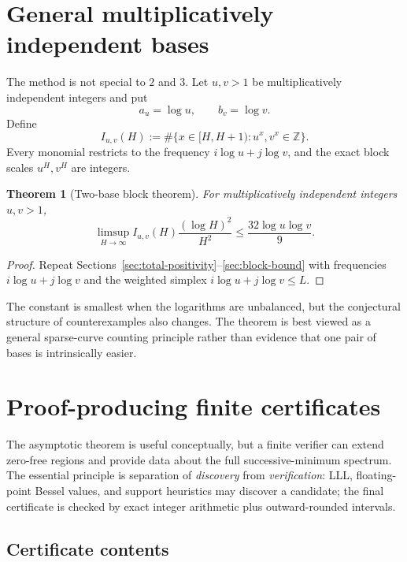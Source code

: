 \documentclass[11pt,oneside]{article}
\newtheorem{theorem}{Theorem}[section]
\theoremstyle{definition}
\theoremstyle{remark}
\newcommand{\Z}{\mathbb Z}
\begin{document}
\section{General multiplicatively independent bases}
\label{sec:general-bases}

The method is not special to $2$ and $3$.  Let $u,v>1$ be multiplicatively independent
integers and put
\[
 a_u=\log u,
 \qquad b_v=\log v.
\]
Define
\[
 I_{u,v}(H):=\#\{x\in[H,H+1):u^x,v^x\in\Z\}.
\]
Every monomial restricts to the frequency $i\log u+j\log v$, and the exact block scales
$u^H,v^H$ are integers.

\begin{theorem}[Two-base block theorem]
\label{thm:general-bases}
For multiplicatively independent integers $u,v>1$,
\begin{equation}
 \limsup_{H\to\infty}
 I_{u,v}(H)\frac{(\log H)^2}{H^2}
 \le\frac{32\log u\log v}{9}.
 \label{eq:general-base-bound}
\end{equation}
\end{theorem}

\begin{proof}
Repeat Sections~\ref{sec:total-positivity}--\ref{sec:block-bound} with frequencies
$i\log u+j\log v$ and the weighted simplex
$i\log u+j\log v\le L$.
\end{proof}

The constant is smallest when the logarithms are unbalanced, but the conjectural structure of
counterexamples also changes.  The theorem is best viewed as a general sparse-curve counting
principle rather than evidence that one pair of bases is intrinsically easier.

\section{Proof-producing finite certificates}
\label{sec:certificate-design}

The asymptotic theorem is useful conceptually, but a finite verifier can extend zero-free
regions and provide data about the full successive-minimum spectrum.  The essential principle
is separation of \emph{discovery} from \emph{verification}: LLL, floating-point Bessel values,
and support heuristics may discover a candidate; the final certificate is checked by exact
integer arithmetic plus outward-rounded intervals.

\subsection{Certificate contents}
\end{document}
